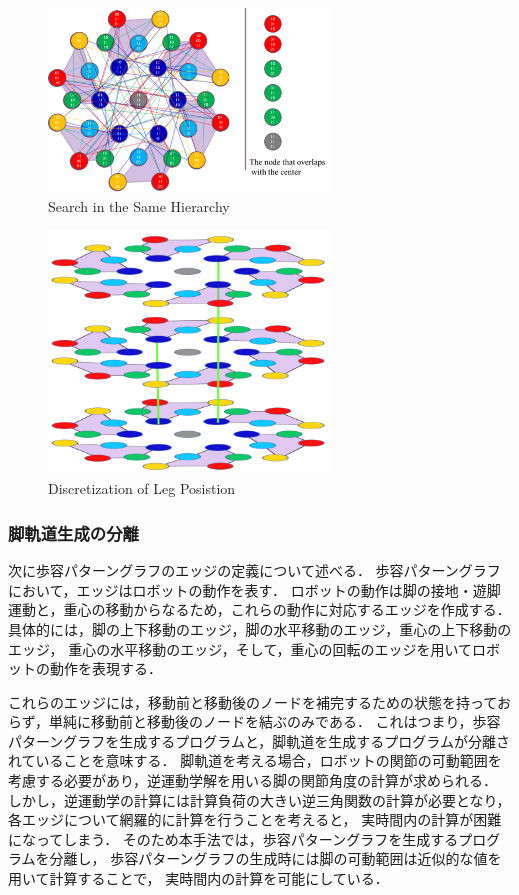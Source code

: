 \begin{figure}[htbp]
  \begin{center}
    \includegraphics[width=75mm, clip]{figure/chapter2/hierarchy2.png}
    \caption{Search in the Same Hierarchy}
    \label{fig:hierarchy2} %
  \end{center}
\end{figure}

\begin{figure}[htbp]
  \begin{center}
    \includegraphics[width=75mm, clip]{figure/chapter2/hierarchy.png}
    \caption{Discretization of Leg Posistion}
    \label{fig:hierarchy} %
  \end{center}
\end{figure}

\subsubsection{脚軌道生成の分離}
次に歩容パターングラフのエッジの定義について述べる．
歩容パターングラフにおいて，エッジはロボットの動作を表す．
ロボットの動作は脚の接地・遊脚運動と，重心の移動からなるため，これらの動作に対応するエッジを作成する．
具体的には，脚の上下移動のエッジ，脚の水平移動のエッジ，重心の上下移動のエッジ，
重心の水平移動のエッジ，そして，重心の回転のエッジを用いてロボットの動作を表現する．

これらのエッジには，移動前と移動後のノードを補完するための状態を持っておらず，単純に移動前と移動後のノードを結ぶのみである．
これはつまり，歩容パターングラフを生成するプログラムと，脚軌道を生成するプログラムが分離されていることを意味する．
脚軌道を考える場合，ロボットの関節の可動範囲を考慮する必要があり，逆運動学解を用いる脚の関節角度の計算が求められる．
しかし，逆運動学の計算には計算負荷の大きい逆三角関数の計算が必要となり，各エッジについて網羅的に計算を行うことを考えると，
実時間内の計算が困難になってしまう．
そのため本手法では，歩容パターングラフを生成するプログラムを分離し，
歩容パターングラフの生成時には脚の可動範囲は近似的な値を用いて計算することで，
実時間内の計算を可能にしている．

